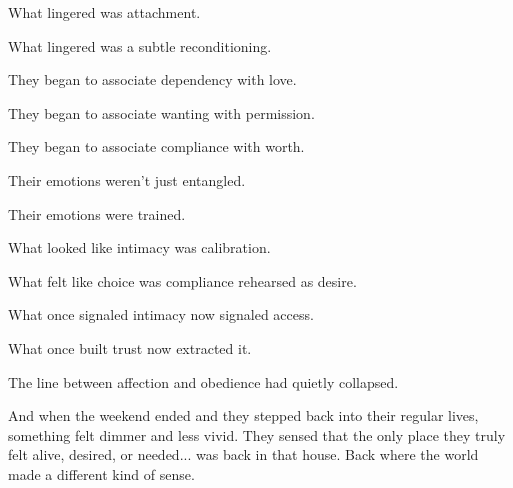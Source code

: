 What lingered was attachment. 

What lingered was a subtle reconditioning. 

They began to associate dependency with love. 

They began to associate wanting with permission.

They began to associate compliance with worth.

Their emotions weren’t just entangled. 

Their emotions were trained.

What looked like intimacy was calibration.

What felt like choice was compliance rehearsed as desire.

What once signaled intimacy now signaled access.

What once built trust now extracted it.

The line between affection and obedience had quietly collapsed.

And when the weekend ended and they stepped back 
into their regular lives, something felt dimmer and less vivid. 
They sensed that the only place they truly felt alive, 
desired, or needed... was back in that house. 
Back where the world made a different kind of sense.

\medskip


